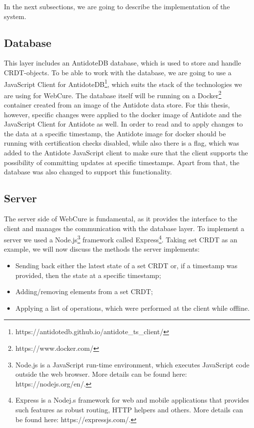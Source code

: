 In the next subsections, we are going to describe the implementation of the system.

\subsection{Database}

This layer includes an AntidoteDB database, which is used to store and handle CRDT-objects. To be able to work with the database, we are going to use a JavaScript Client for AntidoteDB\footnote{https://antidotedb.github.io/antidote\_ts\_client/}, which suits the stack of the technologies we are using for WebCure. The database itself will be running on a Docker\footnote{https://www.docker.com/} container created from an image of the Antidote data store. For this thesis, however, specific changes were applied to the docker image of Antidote and the JavaScript Client for Antidote as well. In order to read and to apply changes to the data at a specific timestamp, the Antidote image for docker should be running with certification checks disabled, while also there is a flag, which was added to the Antidote JavaScript client to make sure that the client supports the possibility of committing updates at specific timestamps. Apart from that, the database was also changed to support this functionality.

\subsection{Server}
\label{impl-server}

The server side of WebCure is fundamental, as it provides the interface to the client and manages the communication with the database layer. To implement a server we used a Node.js\footnote{Node.js is a JavaScript run-time environment, which executes JavaScript code outside the web browser. More details can be found here: https://nodejs.org/en/.} framework called Express\footnote{Express is a Nodej.s framework for web and mobile applications that provides such features as robust routing, HTTP helpers and others. More details can be found here: https://expressjs.com/.}. Taking set CRDT as an example, we will now discuss the methods the server implements:

\begin{itemize}
    \item {Sending back either the latest state of a set CRDT or, if a timestamp was provided, then the state at a specific timestamp;}
    \item {Adding/removing elements from a set CRDT;}
    \item {Applying a list of operations, which were performed at the client while offline.}
\end{itemize}

